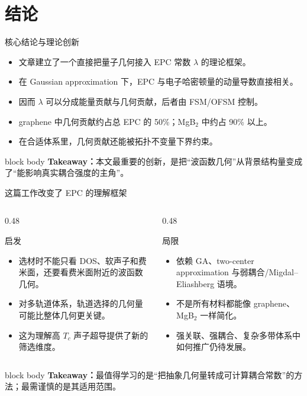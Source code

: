\documentclass[aspectratio=169,11pt,UTF8]{ctexbeamer}
\newcommand{\takeaway}[1]{%
  \vfill
  \begin{beamercolorbox}[wd=\textwidth,sep=0.7ex,rounded=true]{block body}
    \small\textbf{Takeaway：}#1
  \end{beamercolorbox}
}
\begin{document}
\section{结论}

\begin{frame}{核心结论与理论创新}
  \begin{itemize}
    \item 文章建立了一个直接把量子几何接入 EPC 常数 $\lambda$ 的理论框架。
    \item 在 Gaussian approximation 下，EPC 与电子哈密顿量的动量导数直接相关。
    \item 因而 $\lambda$ 可以分成能量贡献与几何贡献，后者由 FSM/OFSM 控制。
    \item graphene 中几何贡献约占总 EPC 的 50\%；MgB$_2$ 中约占 90\% 以上。
    \item 在合适体系里，几何贡献还能被拓扑不变量下界约束。
  \end{itemize}
  \takeaway{本文最重要的创新，是把“波函数几何”从背景结构量变成了“能影响真实耦合强度的主角”。}
\end{frame}

\begin{frame}{这篇工作改变了 EPC 的理解框架}
  \begin{columns}[T]
    \begin{column}{0.48\textwidth}
      \begin{block}{启发}
        \begin{itemize}
          \item 选材时不能只看 DOS、软声子和费米面，还要看费米面附近的波函数几何。
          \item 对多轨道体系，轨道选择的几何量可能比整体几何更关键。
          \item 这为理解高 $T_c$ 声子超导提供了新的筛选维度。
        \end{itemize}
      \end{block}
    \end{column}
    \begin{column}{0.48\textwidth}
      \begin{block}{局限}
        \begin{itemize}
          \item 依赖 GA、two-center approximation 与弱耦合/Migdal--Eliashberg 语境。
          \item 不是所有材料都能像 graphene、MgB$_2$ 一样简化。
          \item 强关联、强耦合、复杂多带体系中如何推广仍待发展。
        \end{itemize}
      \end{block}
    \end{column}
  \end{columns}
  \takeaway{最值得学习的是“把抽象几何量转成可计算耦合常数”的方法；最需谨慎的是其适用范围。}
\end{frame}
\end{document}

